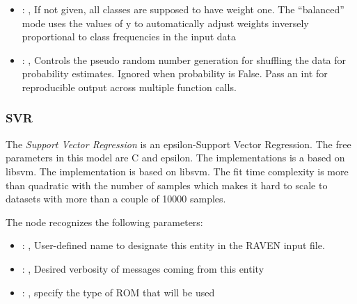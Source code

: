 \begin{itemize}
    \item {}: \xmlDesc{[balanced]}, 
      If not given, all classes are supposed to have weight one.
      The “balanced” mode uses the values of y to automatically adjust weights
      inversely proportional to class frequencies in the input data

    \item {}: , 
      Controls the pseudo random number generation for shuffling
      the data for probability estimates. Ignored when probability is False.
      Pass an int for reproducible output across multiple function calls.
  \end{itemize}


\subsubsection{SVR}
  The  \textit{Support Vector Regression} is an epsilon-Support Vector Regression.
  The free parameters in this model are C and epsilon. The implementations is a based on libsvm.
  The implementation is based on libsvm. The fit time complexity                             is more
  than quadratic with the number of samples which makes it hard                             to scale
  to datasets with more than a couple of 10000 samples.

  The  node recognizes the following parameters:
    \begin{itemize}
      \item {}: , 
        User-defined name to designate this entity in the RAVEN input file.
      \item {}: , 
        Desired verbosity of messages coming from this entity
      \item {}: , 
        specify the type of ROM that will be used
  \end{itemize}

